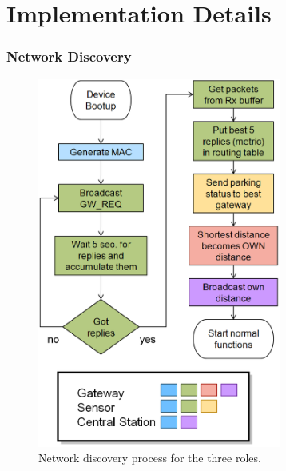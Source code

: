 \chapter{Implementation Details}

\subsection{Network Discovery}
\begin{figure}
    \centering
    \includegraphics[width=8cm]{images/Flowchart_NetworkDiscovery.png}
	\vspace{-1.5em}
    \caption{Network discovery process for the three roles.}
    \vspace{-1.5em}
    \label{fig:network_discovery}
\end{figure}

